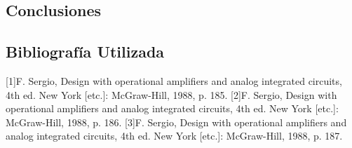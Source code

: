 \documentclass[a4paper]{article}
\begin{document}
\subsection{Conclusiones}

\subsection{Bibliografía Utilizada}
[1]F. Sergio, Design with operational amplifiers and analog integrated circuits, 4th ed. New York [etc.]: McGraw-Hill, 1988, p. 185.
[2]F. Sergio, Design with operational amplifiers and analog integrated circuits, 4th ed. New York [etc.]: McGraw-Hill, 1988, p. 186.
[3]F. Sergio, Design with operational amplifiers and analog integrated circuits, 4th ed. New York [etc.]: McGraw-Hill, 1988, p. 187.
\end{document}

